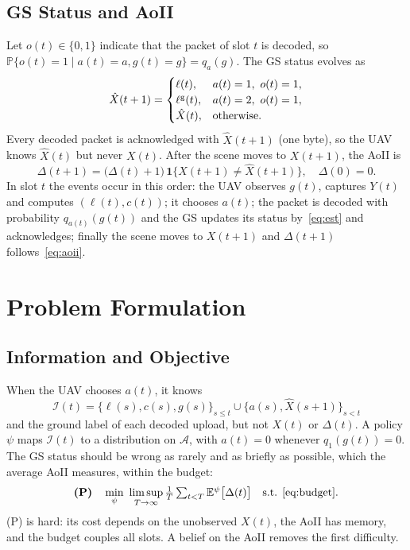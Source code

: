 \documentclass[conference]{IEEEtran}
\theoremstyle{remark}
\newcommand{\E}{\mathbb{E}}
\newcommand{\Prob}{\mathbb{P}}
\newcommand{\ind}[1]{\mathbf{1}\{#1\}}
\newcommand{\A}{\mathcal{A}}
\newcommand{\I}{\mathcal{I}}
\newcommand{\lab}{\ell}
\begin{document}
\subsection{GS Status and AoII}
Let $o(t)\in\{0,1\}$ indicate that the packet of slot $t$ is decoded, so $\Prob\{o(t)=1\mid a(t)=a,g(t)=g\}=q_a(g)$. The GS status evolves as
\begin{equation}\label{eq:est}
\hat X(t+1)=\begin{cases}\lab(t), & a(t)=1,\ o(t)=1,\\ \lab^{\rm g}(t), & a(t)=2,\ o(t)=1,\\ \hat X(t), & \text{otherwise.}\end{cases}
\end{equation}
Every decoded packet is acknowledged with $\hat X(t+1)$ (one byte), so the UAV knows $\hat X(t)$ but never $X(t)$. After the scene moves to $X(t+1)$, the AoII is
\begin{equation}\label{eq:aoii}
\Delta(t+1)=\big(\Delta(t)+1\big)\,\ind{X(t+1)\neq\hat X(t+1)},\quad \Delta(0)=0.
\end{equation}
In slot $t$ the events occur in this order: the UAV observes $g(t)$, captures $Y(t)$ and computes $(\lab(t),c(t))$; it chooses $a(t)$; the packet is decoded with probability $q_{a(t)}(g(t))$ and the GS updates its status by~\eqref{eq:est} and acknowledges; finally the scene moves to $X(t+1)$ and $\Delta(t+1)$ follows~\eqref{eq:aoii}.

\section{Problem Formulation}\label{sec:problem}
\subsection{Information and Objective}
When the UAV chooses $a(t)$, it knows
\begin{equation}\label{eq:info}
\I(t)=\big\{\lab(s),c(s),g(s)\big\}_{s\le t}\cup\big\{a(s),\hat X(s+1)\big\}_{s<t}
\end{equation}
and the ground label of each decoded upload, but not $X(t)$ or $\Delta(t)$. A policy $\psi$ maps $\I(t)$ to a distribution on $\A$, with $a(t)=0$ whenever $q_1(g(t))=0$. The GS status should be wrong as rarely and as briefly as possible, which the average AoII measures, within the budget:
\begin{equation}\label{eq:P}
\textbf{(P)}\quad \min_{\psi}\ \limsup_{T\to\infty}\tfrac1T\textstyle\sum_{t<T}\E^{\psi}\big[\Delta(t)\big]\quad\text{s.t. \eqref{eq:budget}}.
\end{equation}
(P) is hard: its cost depends on the unobserved $X(t)$, the AoII has memory, and the budget couples all slots. A belief on the AoII removes the first difficulty.
\end{document}
